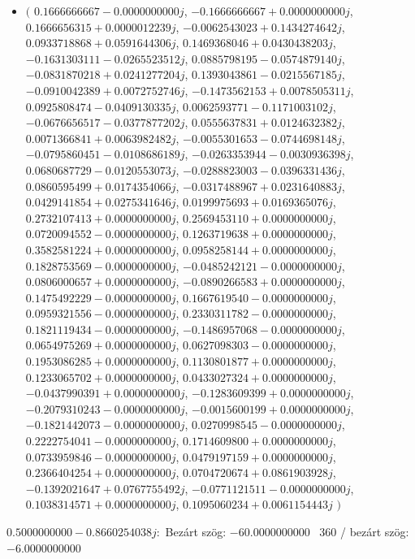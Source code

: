 \documentclass[14pt,a4paper]{article}
\begin{document}
\begin{itemize}
\item
$\big($
$0.1666666667-0.0000000000j$, $-0.1666666667+0.0000000000j$, $0.1666656315+0.0000012239j$, $-0.0062543023+0.1434274642j$, $0.0933718868+0.0591644306j$, $0.1469368046+0.0430438203j$, $-0.1631303111-0.0265523512j$, $0.0885798195-0.0574879140j$, $-0.0831870218+0.0241277204j$, $0.1393043861-0.0215567185j$, $-0.0910042389+0.0072752746j$, $-0.1473562153+0.0078505311j$, $0.0925808474-0.0409130335j$, $0.0062593771-0.1171003102j$, $-0.0676656517-0.0377877202j$, $0.0555637831+0.0124632382j$, $0.0071366841+0.0063982482j$, $-0.0055301653-0.0744698148j$, $-0.0795860451-0.0108686189j$, $-0.0263353944-0.0030936398j$, $0.0680687729-0.0120553073j$, $-0.0288823003-0.0396331436j$, $0.0860595499+0.0174354066j$, $-0.0317488967+0.0231640883j$, $0.0429141854+0.0275341646j$, $0.0199975693+0.0169365076j$, $0.2732107413+0.0000000000j$, $0.2569453110+0.0000000000j$, $0.0720094552-0.0000000000j$, $0.1263719638+0.0000000000j$, $0.3582581224+0.0000000000j$, $0.0958258144+0.0000000000j$, $0.1828753569-0.0000000000j$, $-0.0485242121-0.0000000000j$, $0.0806000657+0.0000000000j$, $-0.0890266583+0.0000000000j$, $0.1475492229-0.0000000000j$, $0.1667619540-0.0000000000j$, $0.0959321556-0.0000000000j$, $0.2330311782-0.0000000000j$, $0.1821119434-0.0000000000j$, $-0.1486957068-0.0000000000j$, $0.0654975269+0.0000000000j$, $0.0627098303-0.0000000000j$, $0.1953086285+0.0000000000j$, $0.1130801877+0.0000000000j$, $0.1233065702+0.0000000000j$, $0.0433027324+0.0000000000j$, $-0.0437990391+0.0000000000j$, $-0.1283609399+0.0000000000j$, $-0.2079310243-0.0000000000j$, $-0.0015600199+0.0000000000j$, $-0.1821442073-0.0000000000j$, $0.0270998545-0.0000000000j$, $0.2222754041-0.0000000000j$, $0.1714609800+0.0000000000j$, $0.0733959846-0.0000000000j$, $0.0479197159+0.0000000000j$, $0.2366404254+0.0000000000j$, $0.0704720674+0.0861903928j$, $-0.1392021647+0.0767755492j$, $-0.0771121511-0.0000000000j$, $0.1038314571+0.0000000000j$, $0.1095060234+0.0061154443j$
$\big)$
\end{itemize}
$0.5000000000-0.8660254038j$:\
Bezárt szög: $-60.0000000000$ \
360 / bezárt szög: $-6.0000000000$\
\end{document}
